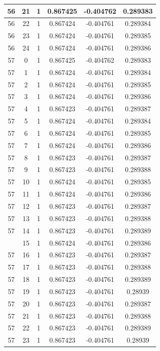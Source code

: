 \documentclass[12pt,a4paper]{article}
\numberwithin{equation}{section}
\numberwithin{figure}{section}
\numberwithin{table}{section}
\begin{document}
\begin{longtable}{|c|c|c|c|c|c|}
56 & 21 & 1 & 0.867425 & -0.404762 & 0.289383 \\ \hline
56 & 22 & 1 & 0.867424 & -0.404761 & 0.289384 \\ \hline
56 & 23 & 1 & 0.867424 & -0.404761 & 0.289385 \\ \hline
56 & 24 & 1 & 0.867424 & -0.404761 & 0.289386 \\ \hline
57 & 0 & 1 & 0.867425 & -0.404762 & 0.289383 \\ \hline
57 & 1 & 1 & 0.867424 & -0.404761 & 0.289384 \\ \hline
57 & 2 & 1 & 0.867424 & -0.404761 & 0.289385 \\ \hline
57 & 3 & 1 & 0.867424 & -0.404761 & 0.289386 \\ \hline
57 & 4 & 1 & 0.867423 & -0.404761 & 0.289387 \\ \hline
57 & 5 & 1 & 0.867424 & -0.404761 & 0.289384 \\ \hline
57 & 6 & 1 & 0.867424 & -0.404761 & 0.289385 \\ \hline
57 & 7 & 1 & 0.867424 & -0.404761 & 0.289386 \\ \hline
57 & 8 & 1 & 0.867423 & -0.404761 & 0.289387 \\ \hline
57 & 9 & 1 & 0.867423 & -0.404761 & 0.289388 \\ \hline
57 & 10 & 1 & 0.867424 & -0.404761 & 0.289385 \\ \hline
57 & 11 & 1 & 0.867424 & -0.404761 & 0.289386 \\ \hline
57 & 12 & 1 & 0.867423 & -0.404761 & 0.289387 \\ \hline
57 & 13 & 1 & 0.867423 & -0.404761 & 0.289388 \\ \hline
57 & 14 & 1 & 0.867423 & -0.404761 & 0.289389 \\ \hline
\pagebreak
57 & 15 & 1 & 0.867424 & -0.404761 & 0.289386 \\ \hline
57 & 16 & 1 & 0.867423 & -0.404761 & 0.289387 \\ \hline
57 & 17 & 1 & 0.867423 & -0.404761 & 0.289388 \\ \hline
57 & 18 & 1 & 0.867423 & -0.404761 & 0.289389 \\ \hline
57 & 19 & 1 & 0.867423 & -0.404761 & 0.28939 \\ \hline
57 & 20 & 1 & 0.867423 & -0.404761 & 0.289387 \\ \hline
57 & 21 & 1 & 0.867423 & -0.404761 & 0.289388 \\ \hline
57 & 22 & 1 & 0.867423 & -0.404761 & 0.289389 \\ \hline
57 & 23 & 1 & 0.867423 & -0.404761 & 0.28939 \\ \hline

\end{longtable}
\end{document}
